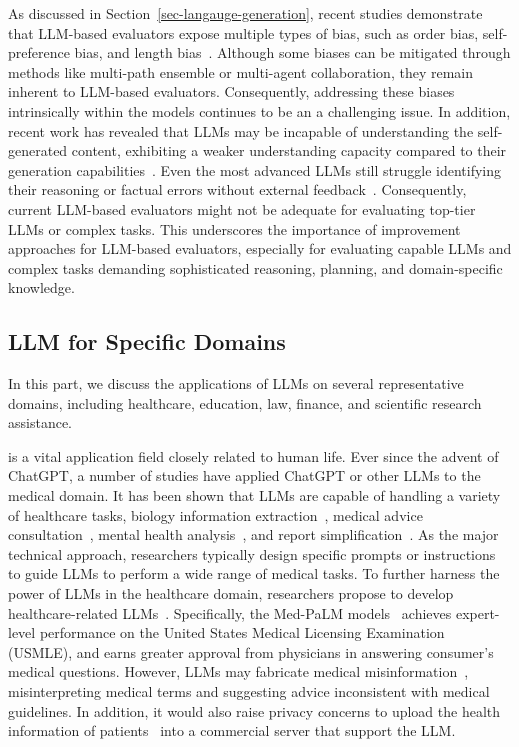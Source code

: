 {{
{
As discussed in Section~\ref{sec-langauge-generation}, recent studies demonstrate that LLM-based evaluators expose multiple types of bias,  such as order bias, self-preference bias, and length bias~\cite{Zheng-2023-arxiv-Judging,Wang-2023-arxiv-Large}.
Although some biases can be mitigated through methods like multi-path ensemble or multi-agent collaboration, they remain inherent to LLM-based evaluators. Consequently, addressing these biases intrinsically within the models continues to be an a challenging issue. 
{In addition, recent work has revealed that LLMs may be incapable of  understanding the self-generated content, exhibiting a weaker understanding capacity  compared to their generation capabilities~\cite{West-23-arxiv-The}. 
Even the most advanced LLMs still struggle identifying their reasoning or factual errors without external feedback~\cite{Huang-23-arixv-Large,Stechly-23-arxiv-GPT4}.} 
Consequently, current LLM-based evaluators might not be adequate for evaluating top-tier LLMs or complex tasks. 
This underscores the importance of improvement approaches for LLM-based evaluators, especially for evaluating capable LLMs and complex tasks demanding sophisticated reasoning, planning, and domain-specific knowledge.
}


\subsection{LLM for Specific Domains}
{In this part, we discuss the applications of LLMs on several representative domains, including healthcare, education, law, finance, and scientific research assistance.}

 is a vital application field closely related to human life. Ever since the advent of ChatGPT, a number of studies have applied ChatGPT or other LLMs to the medical domain. 
It has been shown that LLMs are capable of handling  %
{a variety of healthcare tasks, \eg biology information extraction~\cite{tang-arxiv-2023-does}, medical advice consultation~\cite{Nov-arxiv-2023-Medical}, mental health analysis~\cite{Yang-arxiv-2023-mental}, and report simplification~\cite{Jeblick-arxiv-2023-Medicine}}. 
{As the major technical approach, researchers typically design specific prompts or instructions to guide LLMs to perform a wide range of medical tasks. }
To further harness the power of LLMs in the healthcare domain, researchers propose to develop healthcare-related  LLMs~\cite{singhal-arxiv-2022-large,Singhal-2023-arxiv-Towards,Yang-arxiv-2023-zhongjing}.
Specifically, the Med-PaLM models~\cite{singhal-arxiv-2022-large,Singhal-2023-arxiv-Towards} achieves  expert-level performance  on the {United States Medical Licensing Examination (USMLE)}, and earns greater approval from physicians in answering consumer's medical questions.
However, LLMs may fabricate medical misinformation~\cite{Jeblick-arxiv-2023-Medicine,Chen-medrxiv-2023-cancer}, \eg misinterpreting  medical terms and suggesting advice inconsistent  with medical guidelines.  In addition, it would also raise privacy concerns to upload the health information of patients~\cite{tang-arxiv-2023-does} into a commercial server that support the LLM.

}}
